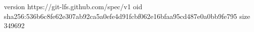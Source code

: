 version https://git-lfs.github.com/spec/v1
oid sha256:536b6c8fe62e307ab92ca5a0efe4d91fcbf062e16bfaa95cd487e0a0bb9fe795
size 349692

